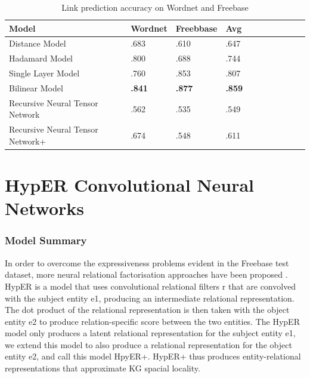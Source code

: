 \begin{table}[H]
	\caption{Link prediction accuracy on Wordnet and Freebase}
	\centering
	\begin{tabular}{lllllllllll}
  		\textbf{Model} & \textbf{Wordnet} & \textbf{Freebbase} & \textbf{Avg} \\
  		\hline
  		Distance Model & .683 & .610 & .647 \\
  		Hadamard Model & .800 & .688 & .744 \\
  		Single Layer Model & .760 & .853 & .807 \\
  		Bilinear Model & \textbf{.841} & \textbf{.877} & \textbf{.859} \\
  		Recursive Neural Tensor Network & .562 & .535 & .549 \\
  		\hline
  		Recursive Neural Tensor Network+ & .674 & .548 & .611 \\
	\end{tabular}
\end{table}



\section{HypER Convolutional Neural Networks}

\subsubsection{Model Summary} 
In order to overcome the expressiveness problems evident in the Freebase test dataset, more neural relational factorisation approaches have been proposed \cite{ComplEx, Neural LP, TorusE}. \newline
HypER is a model that uses convolutional relational filters r that are convolved with the subject entity e1, producing an intermediate relational representation. The dot product of the relational representation is then taken with the object entity e2 to produce relation-specific score between the two entities. The HypER model only produces a latent relational representation for the subject entity e1, we extend this model to also produce a relational representation for the object entity e2, and call this model HpyER+. HypER+ thus produces entity-relational representations that approximate KG spacial locality. \newline
